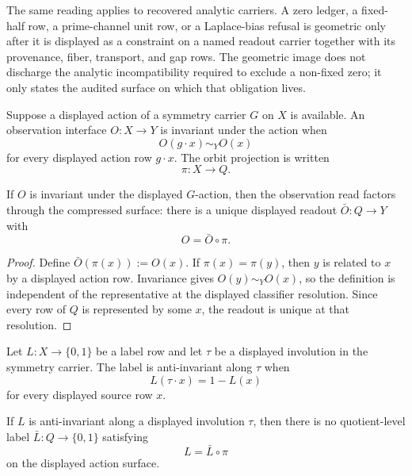 \begin{remark}
\label{rem:interface-recovered-carrier-geometry}
The same reading applies to recovered analytic carriers. A zero ledger,
a fixed-half row, a prime-channel unit row, or a Laplace-bias refusal is
geometric only after it is displayed as a constraint on a named readout
carrier together with its provenance, fiber, transport, and gap rows. The
geometric image does not discharge the analytic incompatibility required
to exclude a non-fixed zero; it only states the audited surface on which
that obligation lives.
\end{remark}

\begin{definition}
\label{def:interface-invariant-observation-descent}
Suppose a displayed action of a symmetry carrier $G$ on $X$ is available.
An observation interface $O:X\to Y$ is invariant under the action when
$$
O(g\cdot x)\sim_Y O(x)
$$
for every displayed action row $g\cdot x$. The orbit projection is written
$$
\pi:X\to Q.
$$
\end{definition}

\begin{theorem}
\label{thm:interface-invariant-observation-descends}
If $O$ is invariant under the displayed $G$-action, then the observation
read factors through the compressed surface: there is a unique displayed
readout $\bar O:Q\to Y$ with
$$
O=\bar O\circ\pi.
$$
\end{theorem}

\begin{proof}
Define $\bar O(\pi(x)):=O(x)$. If $\pi(x)=\pi(y)$, then $y$ is related to
$x$ by a displayed action row. Invariance gives $O(y)\sim_Y O(x)$, so the
definition is independent of the representative at the displayed
classifier resolution. Since every row of $Q$ is represented by some
$x$, the readout is unique at that resolution.
\end{proof}

\begin{definition}
\label{def:interface-anti-invariant-label}
Let $L:X\to\{0,1\}$ be a label row and let $\tau$ be a displayed
involution in the symmetry carrier. The label is anti-invariant along
$\tau$ when
$$
L(\tau\cdot x)=1-L(x)
$$
for every displayed source row $x$.
\end{definition}

\begin{theorem}
\label{thm:interface-anti-invariant-label-no-descent}
If $L$ is anti-invariant along a displayed involution $\tau$, then there
is no quotient-level label $\bar L:Q\to\{0,1\}$ satisfying
$$
L=\bar L\circ\pi
$$
on the displayed action surface.
\end{theorem}

